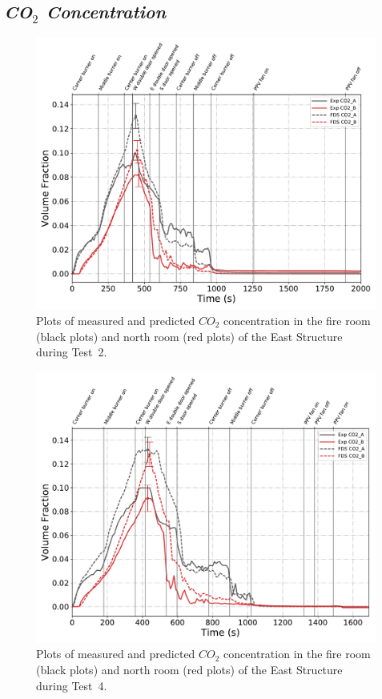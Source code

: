 \clearpage
\subsection*{\textit{CO$_2$ Concentration}}
\begin{figure}[!h]
	\centering
	\includegraphics[width=\columnwidth]{Figures/Plots/Validation/Gas_Concentration/Test_2_CO2}
	\caption[Plots of measured and predicted $CO_2$ concentration during Test~2.]{Plots of measured and predicted $CO_2$ concentration in the fire room (black plots) and north room (red plots) of the East Structure during Test~2.}
	\label{fig:Test2_CO2}
\end{figure}

\begin{figure}[!h]
	\centering
	\includegraphics[width=\columnwidth]{Figures/Plots/Validation/Gas_Concentration/Test_4_CO2}
	\caption[Plots of measured and predicted $CO_2$ concentration during Test~4.]{Plots of measured and predicted $CO_2$ concentration in the fire room (black plots) and north room (red plots) of the East Structure during Test~4.}
	\label{fig:Test4_CO2}
\end{figure}

